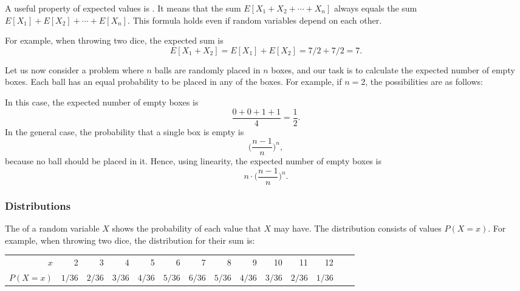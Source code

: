 A useful property of expected values is .
It means that the sum
$E[X_1+X_2+\cdots+X_n]$
always equals the sum
$E[X_1]+E[X_2]+\cdots+E[X_n]$.
This formula holds even if random variables
depend on each other.

For example, when throwing two dice,
the expected sum is
\[E[X_1+X_2]=E[X_1]+E[X_2]=7/2+7/2=7.\]

Let us now consider a problem where
$n$ balls are randomly placed in $n$ boxes,
and our task is to calculate the expected
number of empty boxes.
Each ball has an equal probability to
be placed in any of the boxes.
For example, if $n=2$, the possibilities
are as follows:
\begin{center}
\end{center}
In this case, the expected number of
empty boxes is
\[\frac{0+0+1+1}{4} = \frac{1}{2}.\]
In the general case, the probability that a
single box is empty is
\[\Big(\frac{n-1}{n}\Big)^n,\]
because no ball should be placed in it.
Hence, using linearity, the expected number of
empty boxes is
\[n \cdot \Big(\frac{n-1}{n}\Big)^n.\]

\subsubsection{Distributions}


The  of a random variable $X$
shows the probability of each value that
$X$ may have.
The distribution consists of values $P(X=x)$.
For example, when throwing two dice,
the distribution for their sum is:
\begin{center}
    \small {
        \begin{tabular}{r|rrrrrrrrrrrrr}
            $x$      & 2      & 3      & 4      & 5      & 6      & 7      & 8      & 9      & 10     & 11     & 12     \\
            $P(X=x)$ & $1/36$ & $2/36$ & $3/36$ & $4/36$ & $5/36$ & $6/36$ & $5/36$ & $4/36$ & $3/36$ & $2/36$ & $1/36$ \\
        \end{tabular}
    }
\end{center}

